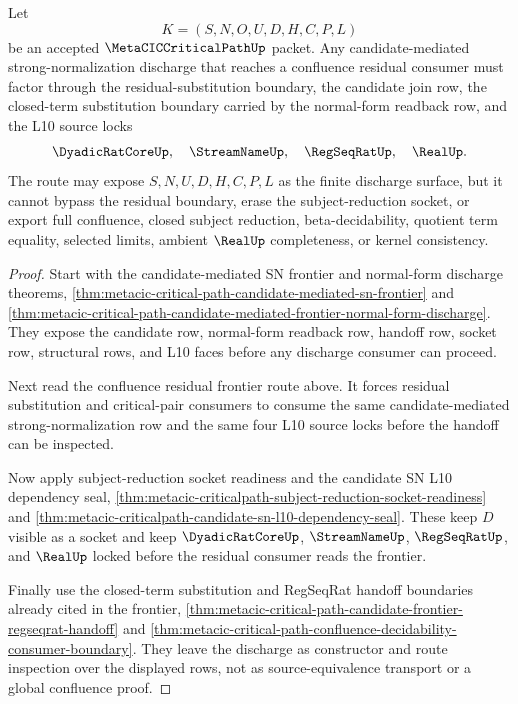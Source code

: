 \begin{theorem}
\label{thm:metacic-criticalpath-candidate-frontier-split-route}
Let
$$
K=(S,N,O,U,D,H,C,P,L)
$$
be an accepted $\MetaCICCriticalPathUp$ packet. Any candidate-mediated strong-normalization discharge that reaches a confluence residual consumer must factor through the residual-substitution boundary, the candidate join row, the closed-term substitution boundary carried by the normal-form readback row, and the L10 source locks
$$
\DyadicRatCoreUp,\quad
\StreamNameUp,\quad
\RegSeqRatUp,\quad
\RealUp .
$$
The route may expose $S,N,U,D,H,C,P,L$ as the finite discharge surface, but it cannot bypass the residual boundary, erase the subject-reduction socket, or export full confluence, closed subject reduction, beta-decidability, quotient term equality, selected limits, ambient $\RealUp$ completeness, or kernel consistency.
\end{theorem}
\begin{proof}
Start with the candidate-mediated SN frontier and normal-form discharge theorems, \autoref{thm:metacic-critical-path-candidate-mediated-sn-frontier} and \autoref{thm:metacic-critical-path-candidate-mediated-frontier-normal-form-discharge}. They expose the candidate row, normal-form readback row, handoff row, socket row, structural rows, and L10 faces before any discharge consumer can proceed.

Next read the confluence residual frontier route above. It forces residual substitution and critical-pair consumers to consume the same candidate-mediated strong-normalization row and the same four L10 source locks before the handoff can be inspected.

Now apply subject-reduction socket readiness and the candidate SN L10 dependency seal, \autoref{thm:metacic-criticalpath-subject-reduction-socket-readiness} and \autoref{thm:metacic-criticalpath-candidate-sn-l10-dependency-seal}. These keep $D$ visible as a socket and keep $\DyadicRatCoreUp$, $\StreamNameUp$, $\RegSeqRatUp$, and $\RealUp$ locked before the residual consumer reads the frontier.

Finally use the closed-term substitution and RegSeqRat handoff boundaries already cited in the frontier, \autoref{thm:metacic-critical-path-candidate-frontier-regseqrat-handoff} and \autoref{thm:metacic-critical-path-confluence-decidability-consumer-boundary}. They leave the discharge as constructor and route inspection over the displayed rows, not as source-equivalence transport or a global confluence proof.
\end{proof}

